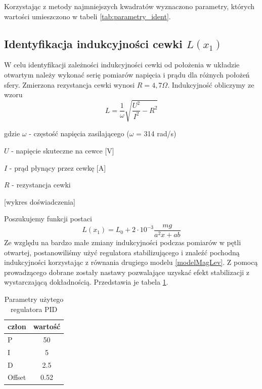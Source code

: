 Korzystając z metody najmniejszych kwadratów wyznaczono parametry, których wartości umieszczono w tabeli  \ref{tab:parametry_ident}.



\subsection{Identyfikacja indukcyjności cewki $L(x_1)$}

W celu identyfikacji zależności indukcyjności cewki od położenia w układzie otwartym należy wykonać serię pomiarów napięcia i prądu dla różnych położeń sfery. Zmierzona rezystancja cewki wynosi $R = 4,7\Omega$. Indukcyjność obliczymy ze wzoru
\begin{equation}
L = \dfrac{1}{\omega}\sqrt{\dfrac{U^2}{I^2} - R^2}
\end{equation}

gdzie
$\omega$ - częstość napięcia zasilającego ($\omega$ = 314 rad/s)

$U$ - napięcie skuteczne na cewce [V]

$I$ - prąd płynący przez cewkę [A]

$R$ - rezystancja cewki

[wykres doświadczenia]

Poszukujemy funkcji postaci
\begin{equation}
L(x_1) = L_0 + 2 \cdot 10^{-3} \dfrac{mg}{a^2x + ab}
\end{equation}
Ze względu na bardzo małe zmiany indukcyjności podczas pomiarów w pętli otwartej, postanowiliśmy użyć regulatora stabilizującego i znaleźć pochodną indukcyjności korzystając z równania drugiego modelu \ref{modelMagLev}.
Z pomocą prowadzącego dobrane zostały nastawy pozwalające uzyskać efekt stabilizacji z wystarczającą dokładnością. Przedstawia je tabela \ref{tab:parametryPID}.

\begin{table}[ht]
\begin{center}
  \begin{tabular}{| l | c | }
    \hline
    człon & wartość \\ \hline
    P 		& 50 \\ \hline
    I 		& 5 \\ \hline
    D 		& 2.5 \\ \hline
    Offset 	& 0.52 \\
    \hline

  \end{tabular}
  \caption{Parametry użytego regulatora PID}
  \label{tab:parametryPID}
\end{center}
\end{table}

